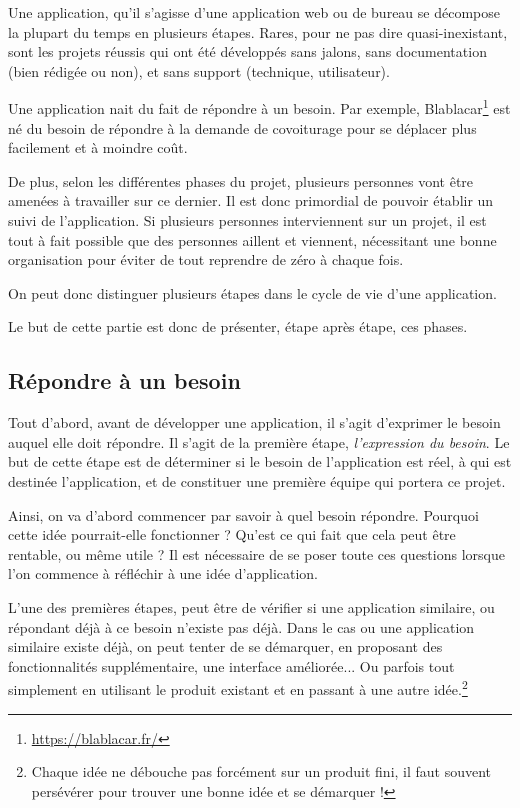 
Une application, qu'il s'agisse d'une application web ou de bureau se décompose la plupart du temps en plusieurs étapes. Rares, pour ne pas dire quasi-inexistant, sont les projets réussis qui ont été développés sans jalons, sans documentation (bien rédigée ou non), et sans support (technique, utilisateur).

Une application nait du fait de répondre à un besoin. Par exemple, Blablacar\footnote{\url{https://blablacar.fr/}} est né du besoin de répondre à la demande de covoiturage pour se déplacer plus facilement et à moindre coût.

De plus, selon les différentes phases du projet, plusieurs personnes vont être amenées à travailler sur ce dernier. Il est donc primordial de pouvoir établir un suivi de l'application. Si plusieurs personnes interviennent sur un projet, il est tout à fait possible que des personnes aillent et viennent, nécessitant une bonne organisation pour éviter de tout reprendre de zéro à chaque fois.

On peut donc distinguer plusieurs étapes dans le cycle de vie d'une application.

Le but de cette partie est donc de présenter, étape après étape, ces phases.



\subsection{Répondre à un besoin}

Tout d'abord, avant de développer une application, il s'agit d'exprimer le besoin auquel elle doit répondre. Il s'agit de la première étape, \emph{l'expression du besoin}. Le but de cette étape est de déterminer si le besoin de l'application est réel, à qui est destinée l'application, et de constituer une première équipe qui portera ce projet.

Ainsi, on va d'abord commencer par savoir à quel besoin répondre. Pourquoi cette idée pourrait-elle fonctionner ? Qu'est ce qui fait que cela peut être rentable, ou même utile ? Il est nécessaire de se poser toute ces questions lorsque l'on commence à réfléchir à une idée d'application. 

L'une des premières étapes, peut être de vérifier si une application similaire, ou répondant déjà à ce besoin n'existe pas déjà. Dans le cas ou une application similaire existe déjà, on peut tenter de se démarquer, en proposant des fonctionnalités supplémentaire, une interface améliorée... Ou parfois tout simplement en utilisant le produit existant et en passant à une autre idée.\footnote{Chaque idée ne débouche pas forcément sur un produit fini, il faut souvent persévérer pour trouver une bonne idée et se démarquer !}

